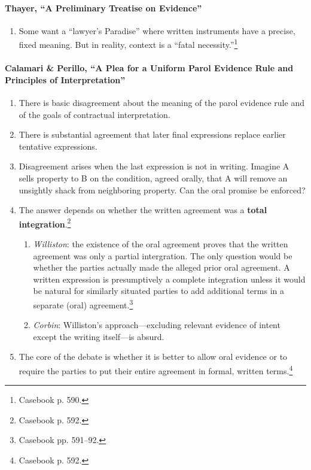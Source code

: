 \paragraph{Thayer, ``A Preliminary Treatise on Evidence''}

\begin{enumerate}
    \item Some want a ``lawyer's Paradise'' where written instruments have a 
    precise, fixed meaning. But in reality, context is a ``fatal 
    necessity.''\footnote{Casebook p. 590.}
\end{enumerate}

\paragraph{Calamari \& Perillo, ``A Plea for a Uniform Parol Evidence Rule and 
Principles of Interpretation''}

\begin{enumerate}
    \item There is basic disagreement about the meaning of the parol evidence 
    rule and of the goals of contractual interpretation.
    \item There is substantial agreement that later final expressions replace 
    earlier tentative expressions.
    \item Disagreement arises when the last expression is not in writing. 
    Imagine A sells property to B on the condition, agreed orally, that A will 
    remove an unsightly shack from neighboring property. Can the oral promise 
    be enforced?
    \item The answer depends on whether the written agreement was a 
    \textbf{total integration}.\footnote{Casebook p. 592.}
    \begin{enumerate}
        \item \emph{Williston}: the existence of the oral agreement proves 
        that the written agreement was only a partial intergration. The only 
        question would be whether the parties actually made the alleged prior 
        oral agreement. A written expression is presumptively a complete 
        integration unless it would be natural for similarly situated parties 
        to add additional terms in a separate (oral) 
        agreement.\footnote{Casebook pp. 591--92.}
        \item \emph{Corbin}: Williston's approach---excluding relevant 
        evidence of intent except the writing itself---is absurd.
    \end{enumerate}
    \item The core of the debate is whether it is better to allow oral 
    evidence or to require the parties to put their entire agreement in 
    formal, written terms.\footnote{Casebook p. 592.}
\end{enumerate}

